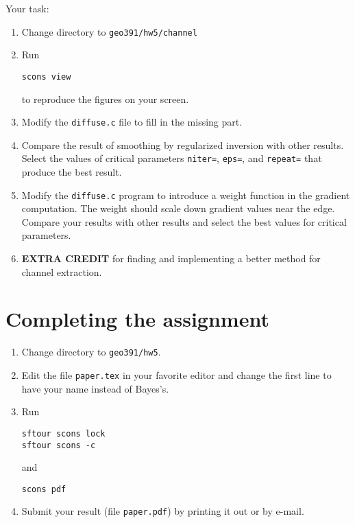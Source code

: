 
\lstset{language=c,numbers=left,numberstyle=\tiny,showstringspaces=false}


Your task:
\begin{enumerate}
\item Change directory to \verb#geo391/hw5/channel#
\item Run 
\begin{verbatim}
scons view
\end{verbatim}
to reproduce the figures on your screen.
\item Modify the \texttt{diffuse.c} file to fill in the missing part.
\item Compare the result of smoothing by regularized inversion with other results. Select the values of critical parameters \texttt{niter=}, \texttt{eps=}, and \texttt{repeat=} that produce the best result.
\item Modify the \texttt{diffuse.c} program to introduce a weight function in the gradient computation. The weight should scale down gradient values near the edge. 
Compare your results with other results and select the best values for critical parameters.
\item \textbf{EXTRA CREDIT} for finding and implementing a better method for channel extraction.
\end{enumerate}

\lstset{language=python,numbers=left,numberstyle=\tiny,showstringspaces=false}


\section{Completing the assignment}

\begin{enumerate}
\item Change directory to \verb#geo391/hw5#.
\item Edit the file \texttt{paper.tex} in your favorite editor and change the
  first line to have your name instead of Bayes's.
\item Run
\begin{verbatim}
sftour scons lock
sftour scons -c
\end{verbatim}
and
\begin{verbatim}
scons pdf
\end{verbatim}
\item Submit your result (file \texttt{paper.pdf}) by printing it out
  or by e-mail.
\end{enumerate}



